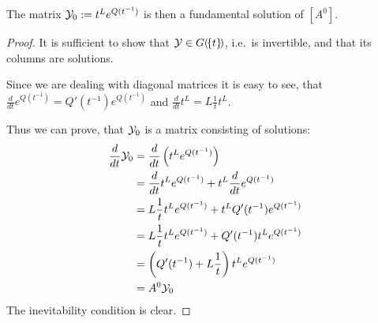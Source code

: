 \begin{lem}
  The matrix $\mathcal{Y}_0:=t^Le^{Q(t^{-1})}$ is then a fundamental solution of
  $[A^0]$.
\end{lem}
\begin{proof}
  It is sufficient to show that $\mathcal{Y}\in G(\!\{t\}\!)$, i.e.\ is invertible, and
  that its columns are solutions.

  \begin{comment}
    Since we are dealing with diagonal matrices it is easy to see, that
    \begin{align*}
      \frac{d}{dt}e^{Q(t^{-1})}
      &=\diag\left(\frac{d}{dt}e^{q_1(t^{-1})},\frac{d}{dt}e^{q_2(t^{-1})}
        ,\dots,
        \frac{d}{dt}e^{q_n(t^{-1})}\right)
        \\&=\diag\left(\frac{d}{dt}q_1(t^{-1})e^{q_1(t^{-1})}
                      ,\frac{d}{dt}q_1(t^{-1})e^{q_2(t^{-1})}
                      ,\dots
                      ,\frac{d}{dt}q_1(t^{-1})e^{q_n(t^{-1})}\right)
    \\&=Q'(t^{-1})e^{Q(t^{-1})} \,.
    \end{align*}
    and, since the function $t^L$ is defined as $e^{L\ln t}$,
    \begin{align*}
      \frac{d}{dt}t^L&=\frac{d}{dt}e^{L\ln t}
    \\&=Le^{(L-\id)\ln t}
    \\&=L\frac{1}{t}t^L \,.
    \end{align*}
  \end{comment}
  Since we are dealing with diagonal matrices it is easy to see, that
  $\frac{d}{dt}e^{Q(t^{-1})}=Q'(t^{-1})e^{Q(t^{-1})}$ and
  $\frac{d}{dt}t^L=L\frac{1}{t}t^L$.

  Thus we can prove, that $\mathcal{Y}_0$ is a matrix consisting of solutions:
  \begin{align*}
    \frac{d}{dt}\mathcal{Y}_0
    &=\frac{d}{dt}\left(t^Le^{Q(t^{-1})}\right)
  \\&=\frac{d}{dt}t^Le^{Q(t^{-1})}+t^L\frac{d}{dt}e^{Q(t^{-1})}
  \\&=L\frac{1}{t}t^Le^{Q(t^{-1})}+t^LQ'(t^{-1})e^{Q(t^{-1})}
  \\&=L\frac{1}{t}t^Le^{Q(t^{-1})}+Q'(t^{-1})t^Le^{Q(t^{-1})}
  \\&=\left(Q'(t^{-1})+L\frac{1}{t}\right)t^Le^{Q(t^{-1})}
  \\&=A^0\mathcal{Y}_0
  \end{align*}
  The inevitability condition is clear.
\end{proof}

